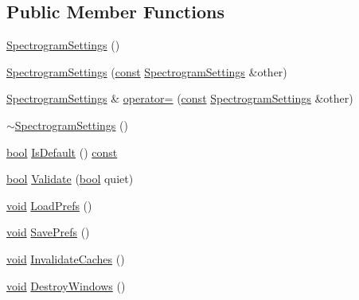 \subsection*{Public Member Functions}
\begin{DoxyCompactItemize}
\item 
\hyperlink{class_spectrogram_settings_ad03ec6da2c1b0cd39aea25af37671cc7}{Spectrogram\+Settings} ()
\item 
\hyperlink{class_spectrogram_settings_af59231acf6510d078eb3cebfa7b59980}{Spectrogram\+Settings} (\hyperlink{getopt1_8c_a2c212835823e3c54a8ab6d95c652660e}{const} \hyperlink{class_spectrogram_settings}{Spectrogram\+Settings} \&other)
\item 
\hyperlink{class_spectrogram_settings}{Spectrogram\+Settings} \& \hyperlink{class_spectrogram_settings_a48655f7b516dda3cbf26b92e7b09f316}{operator=} (\hyperlink{getopt1_8c_a2c212835823e3c54a8ab6d95c652660e}{const} \hyperlink{class_spectrogram_settings}{Spectrogram\+Settings} \&other)
\item 
\hyperlink{class_spectrogram_settings_aabf65b9591a1b6d9b0420f8badfd4808}{$\sim$\+Spectrogram\+Settings} ()
\item 
\hyperlink{mac_2config_2i386_2lib-src_2libsoxr_2soxr-config_8h_abb452686968e48b67397da5f97445f5b}{bool} \hyperlink{class_spectrogram_settings_af87b41c9a6f049b61ddabc8283b1516c}{Is\+Default} () \hyperlink{getopt1_8c_a2c212835823e3c54a8ab6d95c652660e}{const} 
\item 
\hyperlink{mac_2config_2i386_2lib-src_2libsoxr_2soxr-config_8h_abb452686968e48b67397da5f97445f5b}{bool} \hyperlink{class_spectrogram_settings_a1d26cf66c180ad376180da1e5fde23ec}{Validate} (\hyperlink{mac_2config_2i386_2lib-src_2libsoxr_2soxr-config_8h_abb452686968e48b67397da5f97445f5b}{bool} quiet)
\item 
\hyperlink{sound_8c_ae35f5844602719cf66324f4de2a658b3}{void} \hyperlink{class_spectrogram_settings_a4cee425e3f2589bb7bdd68a9e171b07d}{Load\+Prefs} ()
\item 
\hyperlink{sound_8c_ae35f5844602719cf66324f4de2a658b3}{void} \hyperlink{class_spectrogram_settings_a1f36ca5f1f7f7478cf6e61c589471bab}{Save\+Prefs} ()
\item 
\hyperlink{sound_8c_ae35f5844602719cf66324f4de2a658b3}{void} \hyperlink{class_spectrogram_settings_af5b7dfaec831e95c7663ece2c903c56c}{Invalidate\+Caches} ()
\item 
\hyperlink{sound_8c_ae35f5844602719cf66324f4de2a658b3}{void} \hyperlink{class_spectrogram_settings_a01fa70a4a16193cb5b1890c437ec6fe0}{Destroy\+Windows} ()

\end{DoxyCompactItemize}
